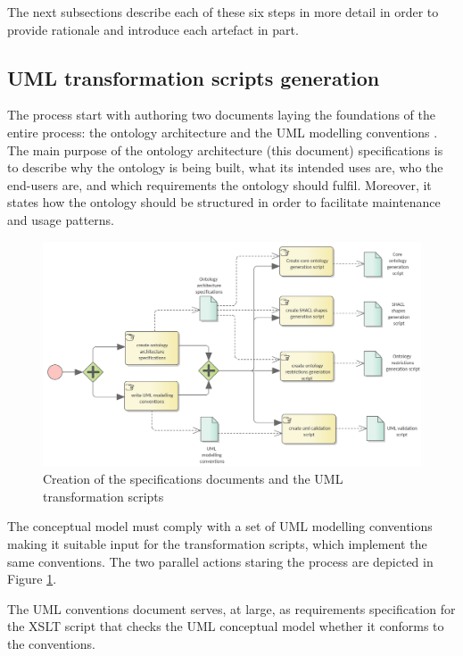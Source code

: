 	The next subsections describe each of these six steps in more detail in order to provide rationale and introduce each artefact in part.
	
	\subsection{UML transformation scripts generation}
	\label{sec:uml-transformation}
	
	The process start with authoring two documents laying the foundations of the entire process: the ontology architecture and the UML modelling conventions \citep{costetchi2020b}. The main purpose of the ontology architecture (this document) specifications is to describe why the ontology is being built, what its intended uses are, who the end-users are, and which requirements the ontology should fulfil. Moreover, it states how the ontology should be structured in order to facilitate maintenance and usage patterns.
	
	
	\begin{figure}[!ht]		
		\centering
		\includegraphics[width=\textwidth]{../img/uml2formalScriptCreation.png}
		\caption{Creation of the specifications documents and the UML transformation scripts}
		\label{fig:uml-transformation}
	\end{figure}
	
	The conceptual model must comply with a set of UML modelling conventions making it suitable input for the transformation scripts, which implement the same conventions. The two parallel actions staring the process are depicted in Figure \ref{fig:uml-transformation}.
		
	The UML conventions document serves, at large, as requirements specification for the XSLT script that checks the UML conceptual model  whether it conforms to the conventions.
	
